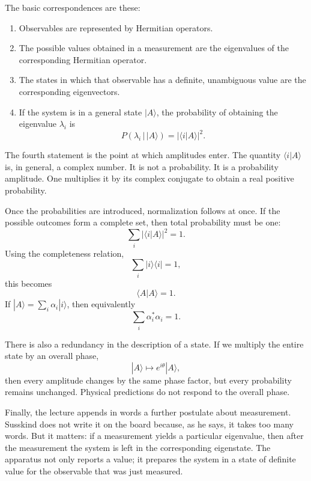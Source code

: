 The basic correspondences are these:
\begin{enumerate}
\item Observables are represented by Hermitian operators.
\item The possible values obtained in a measurement are the eigenvalues of the corresponding Hermitian operator.
\item The states in which that observable has a definite, unambiguous value are the corresponding eigenvectors.
\item If the system is in a general state \(|A\rangle\), the probability of obtaining the eigenvalue \(\lambda_i\) is
\begin{equation}
P(\lambda_i\,|\,|A\rangle)=|\langle i|A\rangle|^2.
\end{equation}
\end{enumerate}

The fourth statement is the point at which amplitudes enter. The quantity \(\langle i|A\rangle\) is, in general, a complex number. It is not a probability. It is a probability amplitude. One multiplies it by its complex conjugate to obtain a real positive probability.

Once the probabilities are introduced, normalization follows at once. If the possible outcomes form a complete set, then total probability must be one:
\begin{equation}
\sum_i |\langle i|A\rangle|^2=1.
\end{equation}
Using the completeness relation,
\begin{equation}
\sum_i |i\rangle\langle i|=1,
\end{equation}
this becomes
\begin{equation}
\langle A|A\rangle=1.
\end{equation}
If \(|A\rangle=\sum_i \alpha_i |i\rangle\), then equivalently
\begin{equation}
\sum_i \alpha_i^*\alpha_i=1.
\end{equation}

There is also a redundancy in the description of a state. If we multiply the entire state by an overall phase,
\begin{equation}
|A\rangle \mapsto e^{i\theta}|A\rangle,
\end{equation}
then every amplitude changes by the same phase factor, but every probability remains unchanged. Physical predictions do not respond to the overall phase.

Finally, the lecture appends in words a further postulate about measurement. Susskind does not write it on the board because, as he says, it takes too many words. But it matters: if a measurement yields a particular eigenvalue, then after the measurement the system is left in the corresponding eigenstate. The apparatus not only reports a value; it prepares the system in a state of definite value for the observable that was just measured.

